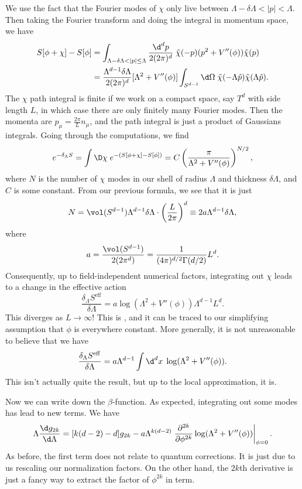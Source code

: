 \documentclass[a4paper]{article}
\begin{document}
We use the fact that the Fourier modes of $\chi$ only live between $\Lambda - \delta \Lambda < |p| < \Lambda$. Then taking the Fourier transform and doing the integral in momentum space, we have
\begin{align*}
  S[\phi + \chi] - S[\phi] &= \int_{\Lambda - \delta \Lambda < |p| \leq \Lambda} \frac{\d^d p}{2 (2\pi)^d}\; \tilde{\chi}(-p) (p^2 + V''(\phi)) \tilde{\chi}(p)\\
  &= \frac{\Lambda^{d - 1} \delta \Lambda}{2(2\pi)^d} [\Lambda^2 + V''(\phi)] \int_{S^{d - 1}} \d \Omega\;\tilde{\chi}(-\Lambda \hat{p}) \tilde{\chi}(\Lambda \hat{p}).
\end{align*}
The $\chi$ path integral is finite if we work on a compact space, say $T^d$ with side length $L$, in which case there are only finitely many Fourier modes. Then the momenta are $p_\mu = \frac{2\pi}{L} n_\mu$, and the path integral is just a product of Gaussians integrals. Going through the computations, we find
\[
  e^{-\delta_\Lambda S} = \int \D \chi\; e^{-(S[\phi + \chi] - S[\phi])} = C \left(\frac{\pi}{\Lambda^2 + V''(\phi)}\right)^{N/2},
\]
where $N$ is the number of $\chi$ modes in our shell of radius $\Lambda$ and thickness $\delta \Lambda$, and $C$ is some constant. From our previous formula, we see that it is just
\[
  N = \vol(S^{d - 1}) \Lambda^{d - 1} \delta \Lambda \cdot \left(\frac{L}{2\pi}\right)^d \equiv 2a \Lambda^{d - 1} \delta \Lambda,
\]
where
\[
  a = \frac{\vol(S^{d - 1})}{2(2\pi^d)} = \frac{1}{(4\pi)^{d/2} \Gamma(d/2)} L^d.
\]
Consequently, up to field-independent numerical factors, integrating out $\chi$ leads to a change in the effective action
\[
  \frac{\delta_\Lambda S^{\mathrm{eff}}}{\delta \Lambda} = a \log (\Lambda^2 + V''(\phi)) \Lambda^{d - 1} L^d.
\]
This diverges as $L \to \infty$! This is , and it can be traced to our simplifying assumption that $\phi$ is everywhere constant. More generally, it is not unreasonable to believe that we have
\[
  \frac{\delta_\Lambda S^{\mathrm{eff}}}{\delta \Lambda} = a \Lambda^{d - 1}\int \d^d x\; \log (\Lambda^2 + V''(\phi)).
\]
This isn't actually quite the result, but up to the local approximation, it is.

Now we can write down the $\beta$-function. As expected, integrating out some modes has lead to new terms. We have
\[
  \Lambda \frac{\d g_{2k}}{\d \Lambda} = [k (d - 2) - d] g_{2k} - a \Lambda^{k(d - 2)} \left.\frac{\partial^{2k}}{\partial \phi^{2k}} \log (\Lambda^2 + V''(\phi))\right|_{\phi = 0}.
\]
As before, the first term does not relate to quantum corrections. It is just due to us rescaling our normalization factors. On the other hand, the $2k$th derivative is just a fancy way to extract the factor of $\phi^{2k}$ in term.
\end{document}
